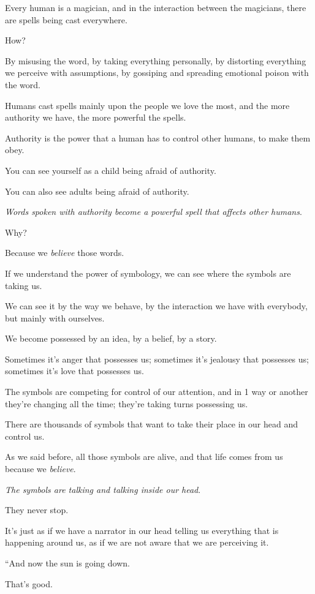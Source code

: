 \documentclass{article}
\numberwithin{equation}{section}
\begin{document}
%
Every human is a magician, and in the interaction between the magicians, there are spells being cast everywhere.

How?

By misusing the word, by taking everything personally, by distorting everything we perceive with assumptions, by gossiping and spreading emotional poison with the word.

Humans cast spells mainly upon the people we love the most, and the more authority we have, the more powerful the spells.

Authority is the power that a human has to control other humans, to make them obey.

You can see yourself as a child being afraid of authority.

You can also see adults being afraid of authority.

\textit{Words spoken with authority become a powerful spell that affects other humans}.

Why?

Because we \textit{believe} those words.

%
If we understand the power of symbology, we can see where the symbols are taking us.

We can see it by the way we behave, by the interaction we have with everybody, but mainly with ourselves.

We become possessed by an idea, by a belief, by a story.

Sometimes it's anger that possesses us; sometimes it's jealousy that possesses us; sometimes it's love that possesses us.

The symbols are competing for control of our attention, and in 1 way or another they're changing all the time; they're taking turns possessing us.

There are thousands of symbols that want to take their place in our head and control us.

As we said before, all those symbols are alive, and that life comes from us because we \textit{believe}.

%
\textit{The symbols are talking and talking inside our head}.

They never stop.

It's just as if we have a narrator in our head telling us everything that is happening around us, as if we are not aware that we are perceiving it.

``And now the sun is going down.

That's good.
\end{document}
